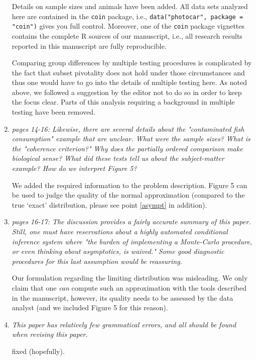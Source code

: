 \documentclass[11pt]{article}
\begin{document}
\begin{enumerate}
Details on sample sizes and animals have been added. All data sets analyzed
here are contained in the \texttt{coin} package, i.e., \texttt{data("photocar", package =
"coin")} gives you full control. Moreover, one of the \texttt{coin} package
vignettes contains the complete \textsf{R} sources of our manuscript, i.e.,
all research results reported in this manuscript are fully reproducible.

Comparing group differences by multiple testing procedures is complicated by
the fact that subset pivotality does not hold under those circumstances and
thus one would have to go into the details of multiple testing here. As
noted above, we followed a suggestion by the editor not to do so in order to
keep the focus clear. Parts of this analysis requiring a background in
multiple testing have been removed.

\item \textsl{pages 14-16:  Likewise, there are several details about the "contaminated fish 
              consumption" example that are unclear. What were the sample sizes? What is the 
              "coherence criterion?" Why does the partially ordered comparison make biological 
              sense? What did these tests tell us about the subject-matter example? How do we 
              interpret Figure 5? }

We added the required information to the problem description. Figure 5 can
be used to judge the quality of the normal approximation (compared to the
true `exact' distribution, please see point \ref{asympt} in addition).
 
\item \textsl{pages 16-17:  The discussion provides a fairly accurate summary of this paper. 
              Still, one must have reservations about a highly automated conditional inference 
              system where "the burden of implementing a Monte-Carlo procedure, or even thinking 
              about asymptotics, is waived." Some good diagnostic procedures for this last 
              assumption would be reassuring. }
 
Our formulation regarding the limiting distribution was misleading.
We only claim that one \textit{can} compute such an approximation with the
tools described in the manuscript, however, its quality needs to be
assessed by the data analyst (and we included Figure 5 for this reason).

\item \textsl{This paper has relatively few grammatical errors, and all should be found when 
              revising this paper.}

fixed (hopefully).

\end{enumerate}
\end{document}
